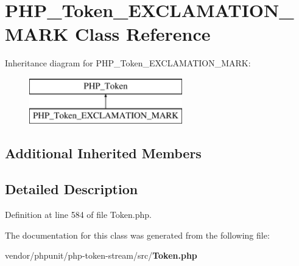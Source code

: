 \section{P\+H\+P\+\_\+\+Token\+\_\+\+E\+X\+C\+L\+A\+M\+A\+T\+I\+O\+N\+\_\+\+M\+A\+R\+K Class Reference}
\label{class_p_h_p___token___e_x_c_l_a_m_a_t_i_o_n___m_a_r_k}
Inheritance diagram for P\+H\+P\+\_\+\+Token\+\_\+\+E\+X\+C\+L\+A\+M\+A\+T\+I\+O\+N\+\_\+\+M\+A\+R\+K\+:\begin{figure}[H]
\begin{center}
\leavevmode
\includegraphics[height=2.000000cm]{class_p_h_p___token___e_x_c_l_a_m_a_t_i_o_n___m_a_r_k}
\end{center}
\end{figure}
\subsection*{Additional Inherited Members}


\subsection{Detailed Description}


Definition at line 584 of file Token.\+php.



The documentation for this class was generated from the following file\+:\begin{DoxyCompactItemize}
\item 
vendor/phpunit/php-\/token-\/stream/src/{\bf Token.\+php}\end{DoxyCompactItemize}
